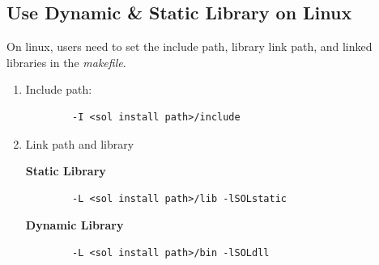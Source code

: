 \documentclass[11pt,a4paper]{article}
\newlength{\wideitemsep}
\let\olditem\item
\renewcommand{\item}{\setlength{\itemsep}{\wideitemsep}\olditem}
\begin{document}
\begin{enumerate}
\begin{lstlisting}
        \end{lstlisting}
\end{enumerate}

\subsection{Use Dynamic \& Static Library on Linux}
On linux, users need to set the include path, library link path, and linked
libraries in the \emph{makefile}. 
\begin{enumerate}
    \item Include path: 
        \lstset{language=C++, 
            framexleftmargin=-1.5cm,
            xleftmargin=-1.5cm,
        }   
        \begin{lstlisting}
        -I <sol install path>/include
        \end{lstlisting}
    \item Link path and library

        \textbf{Static Library}
        \lstset{language=bash}
        \begin{lstlisting}
        -L <sol install path>/lib -lSOLstatic
        \end{lstlisting}
        \textbf{Dynamic Library}
        \lstset{language=bash}
        \begin{lstlisting}
        -L <sol install path>/bin -lSOLdll
        \end{lstlisting}
\end{enumerate}

\lstset{language=C++, 
    framexleftmargin=-1cm,
    xleftmargin=-1cm,
}
\end{document}
